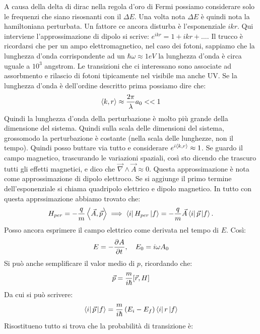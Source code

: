 \documentclass[../AppuntiStruttura.tex]{subfiles}
\begin{document}
		A causa della delta di dirac nella regola d'oro di Fermi possiamo considerare solo le frequenzi che siano risosnanti con il $ \Delta E $. Una volta nota $ \Delta E $ è quindi nota la hamiltoniana perturbata. Un fattore ce ancora disturba è l'esponenziale $ ikr $. Qui interviene l'approssimazione di dipolo si scrive: $ e^{ikr}=1+ikr+\dots $. Il trucco è ricordarsi che per un  ampo elettromagnetico, nel caso dei fotoni, sappiamo che la lunghezza d'onda corrispondente ad un $ \hbar\omega\approx 1eV $ la lunghezza d'onda è circa uguale a $ 10^{3} $ angstrom. Le transizioni che ci interessano sono associate ad assorbmento e rilascio di fotoni tipicamente nel visibile ma anche UV. Se la lunghezza d'onda è dell'ordine descritto prima possiamo dire che:
		\begin{gather*}
		\scal{k}{r}\approx \dfrac{2\pi}{\lambda}a_{0}<<1
		\end{gather*} 
		Quindi la lunghezza d'onda della perturbazione è molto più grande della dimensione del sistema. Quindi sulla scala delle dimensioni del sistema, grossomodo la perturbazione è costante (nella scala delle lunghezze, non il tempo). Quindi posso buttare via tutto e considerare $ e^{i\scal{k}{r}}\approx1 $. Se guardo il campo magnetico, trascurando le variazioni spaziali, così sto dicendo che trascuro tutti gli effetti magnetici, e dico che $ \vec{\nabla}\wedge\vec{A}\approx
		 0 $. Questa approssimazione è nota come approssimazione di dipolo elettroco. Se si aggiunge il primo termine dell'esponenziale si chiama quadripolo elettrico e dipolo magnetico. In tutto con questa apprssimazione abbiamo trovato che:
		 \begin{gather*}
		 H_{per}=-\dfrac{q}{m}\scal{\vec{A}}{\vec{p}}\implies \bra{i}H_{per}\ket{f}=-\dfrac{q}{m}\vec{A}\bra{i}\vec{p}\ket{f}.
		 \end{gather*}
		 Posso ancora esprimere il campo elettrico come derivata nel tempo di $ E$. Così:
		 \begin{gather*}
		 E=-\derp[]{A}{t},\quad E_{0}=i\omega A_{0}
		 \end{gather*}
		 Si può anche semplificare il valor medio di $ p $, ricordando che:
		 \begin{gather*}
		 \vec{p}= \dfrac{m}{i\hbar}\comm{\vec{r}}{H}
		 \end{gather*}
		 Da cui si può scrivere:
		 \begin{gather*}
		 \bra{i}\vec{p}\ket{f}=\dfrac{m}{i\hbar}\left(E_{i}-E_{f}\right)\bra{i}r\ket{f}
		 \end{gather*}
		 Risostitueno tutto si trova che la probabilità di transizione è:
\end{document}
